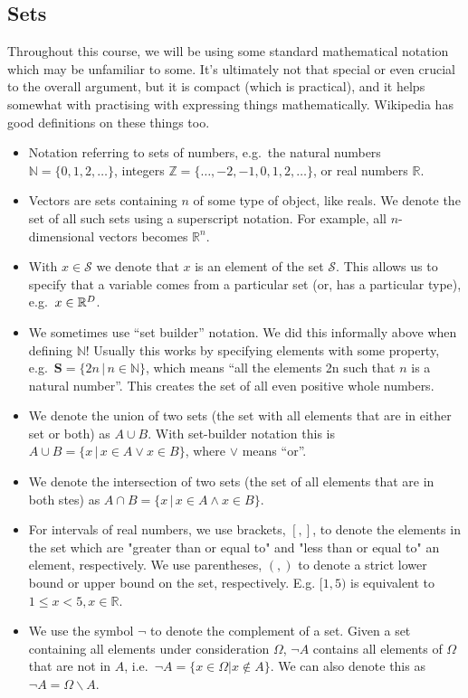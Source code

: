 \documentclass[a4paper]{article}
\theoremstyle{definition}
\begin{document}
\subsection{Sets}
Throughout this course, we will be using some standard mathematical notation which may be unfamiliar to some. It's ultimately not that special or even crucial to the overall argument, but it is compact (which is practical), and it helps somewhat with practising with expressing things mathematically. Wikipedia has good definitions on these things too.
\begin{itemize}
\item Notation referring to sets of numbers, e.g.~the natural numbers $\mathbb N = \{0, 1, 2, \dots\}$, integers $\mathbb Z = \{\dots, -2, -1, 0, 1, 2, \dots\}$, or real numbers $\mathbb R$.
\item Vectors are sets containing $n$ of some type of object, like reals. We denote the set of all such sets using a superscript notation. For example, all $n$-dimensional vectors becomes $\mathbb R^n$.
\item With $x \in \mathcal S$ we denote that $x$ is an element of the set $\mathcal S$. This allows us to specify that a variable comes from a particular set (or, has a particular type), e.g.~$x \in \mathbb{R}^D$.
\item We sometimes use ``set builder'' notation. We did this informally above when defining $\mathbb N$! Usually this works by specifying elements with some property, e.g.~$\mathbf S = \{2n \,|\, n \in \mathbb N\}$, which means ``all the elements 2n such that $n$ is a natural number''. This creates the set of all even positive whole numbers.
\item We denote the union of two sets (the set with all elements that are in either set or both) as $A \cup B$. With set-builder notation this is $A \cup B = \{x\,|\,x\in A \vee x\in B\}$, where $\vee$ means ``or''.
\item We denote the intersection of two sets (the set of all elements that are in both stes) as $A \cap B = \{x\,|\,x\in A \wedge x\in B\}$.
\item For intervals of real numbers, we use brackets, $[,]$, to denote the elements in the set which are "greater than or equal to" and "less than or equal to" an element, respectively. We use parentheses, $(,)$ to denote a strict lower bound or upper bound on the set, respectively. E.g. $[1,5)$ is equivalent to $1 \leq x < 5, x\in\mathbb{R}$.
\item We use the symbol $\neg$ to denote the complement of a set. Given a set containing all elements under consideration $\Omega$, $\neg A$ contains all elements of $\Omega$ that are not in $A$, i.e.~$\neg A = \{x \in \Omega | x \notin A\}$. We can also denote this as $\neg A = \Omega\backslash A$.
\end{itemize}
\end{document}
